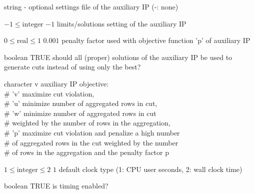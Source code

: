 %
{string}%
{-}%
{optional settings file of the auxiliary IP (-: none)}%
{}

%
{$-1\leq\textrm{integer}$}%
{$-1$}%
{limits/solutions setting of the auxiliary IP}%
{}

%
{$0\leq\textrm{real}\leq1$}%
{$0.001$}%
{penalty factor used with objective function 'p' of auxiliary IP}%
{}

%
{boolean}%
{TRUE}%
{should all (proper) solutions of the auxiliary IP be used to generate cuts instead of using only the best?}%
{}

%
{character}%
{v}%
{auxiliary IP objective:\\   \#                      'v' maximize cut violation,\\   \#                      'u' minimize number of aggregated rows in cut,\\   \#                      'w' minimize number of aggregated rows in cut\\   \#                          weighted by the number of rows in the aggregation,\\   \#                      'p' maximize cut violation and penalize a high number\\   \#                          of aggregated rows in the cut weighted by the number\\   \#                          of rows in the aggregation and the penalty factor p                     }%
{}

%
{$1\leq\textrm{integer}\leq2$}%
{$1$}%
{default clock type (1: CPU user seconds, 2: wall clock time)}%
{}

%
{boolean}%
{TRUE}%
{is timing enabled?}%
{}

